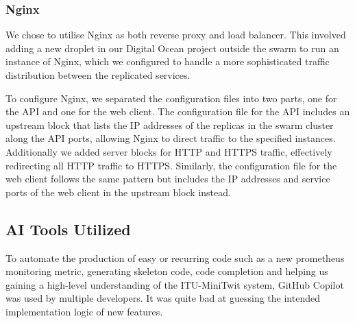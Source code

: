 \subsubsection*{Nginx}
We chose to utilise Nginx as both reverse proxy and load balancer. This involved adding a new droplet in our Digital Ocean project outside the swarm to run an instance of Nginx, which we configured to handle a more sophisticated traffic distribution between the replicated services.

To configure Nginx, we separated the configuration files into two parts, one for the API and one for the web client. The configuration file for the API includes an upstream block that lists the IP addresses of the replicas in the swarm cluster along the API ports, allowing Nginx to direct traffic to the specified instances. Additionally we added server blocks for HTTP and HTTPS traffic, effectively redirecting all HTTP traffic to HTTPS. Similarly, the configuration file for the web client follows the same pattern but includes the IP addresses and service ports of the web client in the upstream block instead. 


\subsection{AI Tools Utilized}
To automate the production of easy or recurring code such as a new prometheus monitoring metric, generating skeleton code, code completion and helping us gaining a high-level understanding of the ITU-MiniTwit system, GitHub Copilot was used by multiple developers. It was quite bad at guessing the intended implementation logic of new features.